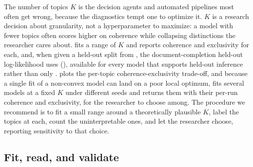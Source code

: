 \documentclass[article]{jss}
\begin{document}
The number of topics $K$ is the decision agents and automated pipelines most
often get wrong, because the diagnostics tempt one to optimize it. $K$ is a
research decision about granularity, not a hyperparameter to maximize: a model
with fewer topics often scores higher on coherence while collapsing distinctions
the researcher cares about.  fits a range of $K$ and
reports coherence and exclusivity for each, and, when given a held-out split from
, the document-completion held-out log-likelihood
 uses (), available for every model that
supports held-out inference rather than only .
 plots the per-topic coherence-exclusivity
trade-off, and because a single fit of a non-convex model can land on a poor
local optimum,  fits several models at a fixed $K$
under different seeds and returns them with their per-run coherence and
exclusivity, for the researcher to choose among. The procedure we recommend is to
fit a small range around a theoretically plausible $K$, label the topics at each,
count the uninterpretable ones, and let the researcher choose, reporting
sensitivity to that choice.

\subsection{Fit, read, and validate}
\end{document}
